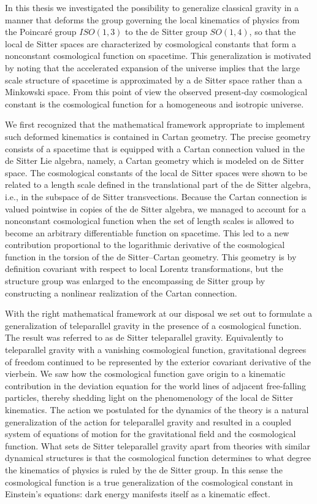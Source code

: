 \documentclass[
final,
11pt,
a4paper,
DIV=11,
headinclude=true,
footinclude=false,
bibliography=totoc,
twoside=true,  %
BCOR=5mm
]{scrbook}
\begin{document}
In this thesis we investigated the possibility to generalize 
classical gravity in a manner that deforms the group governing 
the local kinematics of physics from the Poincar\'e group 
$ISO(1,3)$ to the de Sitter group $SO(1,4)$, so that the local de 
Sitter spaces are characterized by cosmological constants that 
form a nonconstant cosmological function on spacetime. This 
generalization is motivated by noting that the accelerated 
expansion of the universe implies that the large scale structure 
of spacetime is approximated by a de Sitter space rather than 
a Minkowski space. From this point of view the observed 
present-day cosmological constant is the cosmological function 
for a homogeneous and isotropic universe. 

We first recognized that the mathematical framework appropriate 
to implement such deformed kinematics is contained in Cartan 
geometry. The precise geometry consists of a spacetime that is 
equipped with a Cartan connection valued in the de Sitter Lie
algebra, namely, a Cartan geometry which is modeled on de Sitter 
space. The cosmological constants of the local de Sitter spaces 
were shown to be related to a length scale defined in the 
translational part of the de Sitter algebra, i.e., in the 
subspace of de Sitter transvections.  Because the Cartan 
connection is valued pointwise in copies of the de Sitter 
algebra, we managed to account for a nonconstant cosmological 
function when the set of length scales is allowed to become an 
arbitrary differentiable function on spacetime. This led to a new 
contribution proportional to the logarithmic derivative of the 
cosmological function in the torsion of the de Sitter--Cartan 
geometry. This geometry is by definition covariant with respect 
to local Lorentz transformations, but the structure group was 
enlarged to the encompassing de Sitter group by constructing 
a nonlinear realization of the Cartan connection.

With the right mathematical framework at our disposal we set out 
to formulate a generalization of teleparallel gravity in the 
presence of a cosmological function.  The result was referred to 
as de Sitter teleparallel gravity.  Equivalently to teleparallel 
gravity with a vanishing cosmological function, gravitational 
degrees of freedom continued to be represented by the exterior 
covariant derivative of the vierbein. We saw how the cosmological 
function gave origin to a kinematic contribution in the deviation 
equation for the world lines of adjacent free-falling particles, 
thereby shedding light on the phenomenology of the local de 
Sitter kinematics. The action we postulated for the dynamics of 
the theory is a natural generalization of the action for 
teleparallel gravity and resulted in a coupled system of 
equations of motion for the gravitational field and the 
cosmological function. What sets de Sitter teleparallel gravity 
apart from theories with similar dynamical structures is that the 
cosmological function determines to what degree the kinematics of 
physics is ruled by the de Sitter group. In this sense the 
cosmological function is a true generalization of the 
cosmological constant in Einstein's equations: dark energy 
manifests itself as a kinematic effect.
\end{document}
